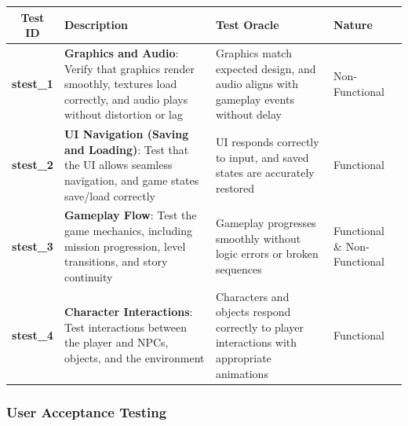 \documentclass[11pt, a4paper]{article}
\begin{document}
\begin{tabularx}{\linewidth}{|c|X|X|>{\raggedright\arraybackslash}m{2cm}|}
    \hline
    \textbf{Test ID} & \textbf{Description} & \textbf{Test Oracle} & \textbf{Nature} \\
    \hline
    \textbf{stest\_1} & \textbf{Graphics and Audio}: Verify that graphics render smoothly, textures load correctly, and audio plays without distortion or lag & Graphics match expected design, and audio aligns with gameplay events without delay & Non-Functional \\
    \hline
    \textbf{stest\_2} & \textbf{UI Navigation (Saving and Loading)}: Test that the UI allows seamless navigation, and game states save/load correctly & UI responds correctly to input, and saved states are accurately restored & Functional \\
    \hline
    \textbf{stest\_3} & \textbf{Gameplay Flow}: Test the game mechanics, including mission progression, level transitions, and story continuity & Gameplay progresses smoothly without logic errors or broken sequences & Functional \& Non-Functional \\
    \hline
    \textbf{stest\_4} & \textbf{Character Interactions}: Test interactions between the player and NPCs, objects, and the environment & Characters and objects respond correctly to player interactions with appropriate animations & Functional \\
    \hline
\end{tabularx}

\subsubsection{User Acceptance Testing}
\end{document}

